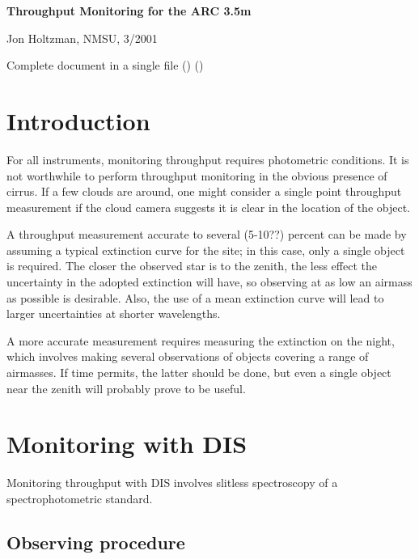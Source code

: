 \documentclass{article}
\begin{document}
\begin{center}
\textbf{Throughput Monitoring for the ARC 3.5m}
\end{center}
\begin{center}
Jon Holtzman, NMSU, 3/2001
\end{center}

\begin{htmlonly}
Complete document in a single file
()
()
\end{htmlonly}

\section{Introduction}

For all instruments, monitoring throughput requires photometric conditions.
It is not worthwhile to perform throughput monitoring in the obvious
presence of cirrus. If a few clouds are around, one might consider a single
point throughput measurement if the cloud camera suggests it is clear
in the location of the object.

A throughput measurement accurate to several (5-10??) percent can be made
by assuming a typical extinction curve for the site; in this case, only a
single object is required.  The closer the observed star is to the zenith,
the less effect the uncertainty in the adopted extinction will have, so
observing at as low an airmass as possible is desirable. Also, the
use of a mean extinction curve will lead to larger uncertainties at
shorter wavelengths.

A more accurate measurement requires measuring the extinction on the
night, which involves making several observations of objects covering
a range of airmasses. If time permits, the latter should be done, but
even a single object near the zenith will probably prove to be useful.

\section{Monitoring with DIS}

Monitoring throughput with DIS involves slitless spectroscopy of a 
spectrophotometric standard. 

\subsection{Observing procedure}
\end{document}
